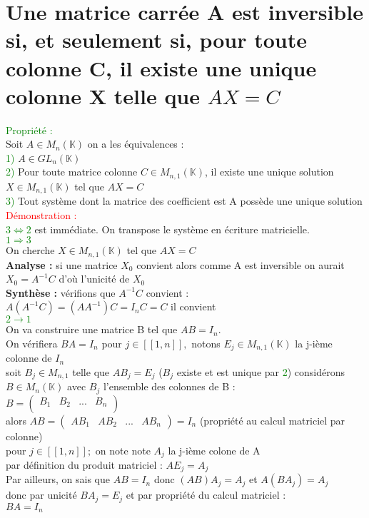 \documentclass{article}
\begin{document}
	\section{Une matrice carrée A est inversible si, et seulement si, pour toute colonne C, il existe une unique colonne X telle que $AX=C$}
	\textcolor{green}{Propriété :} \\
	Soit $A \in M_n(\mathbb K)$ on a les équivalences : \\
	\textcolor{green}{1)} $A \in GL_n(\mathbb K)$ \\
	\textcolor{green}{2)} Pour toute matrice colonne $C \in M_{n,1}(\mathbb K)$, il existe une unique solution $X \in M_{n,1}(\mathbb K)$ tel que $AX=C$ \\
	\textcolor{green}{3)} Tout système dont la matrice des coefficient est A possède une unique solution \\
	\textcolor{red}{Démonstration :} \\
	\textcolor{green}{$3 \Leftrightarrow 2$ } est immédiate. On transpose le système en écriture matricielle. \\
	\textcolor{green}{$1 \Rightarrow 3$} \\
	On cherche $X \in M_{n,1}(\mathbb K)$ tel que  $AX=C$ \\
	{\bf Analyse :} si une matrice $X_0$ convient alors comme A est inversible on aurait $X_0=A^{-1}C$ d'où l'unicité de $X_0$ \\
	{\bf Synthèse :} vérifions que $A^{-1}C$ convient : \\
	$A(A^{-1}C)= (A A^{-1})C=I_n C =C$ il convient \\
	\textcolor{green}{ $2 \rightarrow 1$} \\
	On va construire une matrice B tel que $AB=I_n$. \\
	On vérifiera $BA=I_n$ pour $j \in [[1,n]],$ notons $E_j \in M_{n,1}(\mathbb K)$ la j-ième colonne de $I_n$ \\
	soit $B_j \in M_{n,1}$ telle que $AB_j=E_j$ ($B_j$ existe et est unique par \textcolor{green}{2}) considérons $B \in M_n(\mathbb K)$ avec $B_j$ l'ensemble des colonnes de B : \\
	$B= \begin{pmatrix}
B_1 & B_2 & ... & B_n \\
	\end{pmatrix}$ \\
	alors $AB= \begin{pmatrix}
	AB_1 & AB_2 & ... & AB_n\end{pmatrix}=I_n$ (propriété au calcul matriciel par colonne) \\
	pour $j \in [[1,n]] ;$ on note note $A_j$ la j-ième colone de A \\
	par définition du produit matriciel : $AE_j=A_j$ \\
	Par ailleurs, on sais que $AB=I_n$ donc $(AB)A_j=A_j$ et $A(BA_j)=A_j$ \\
	donc par unicité $BA_j=E_j$ et par propriété du calcul matriciel : \\
	$BA=I_n$
\end{document}

